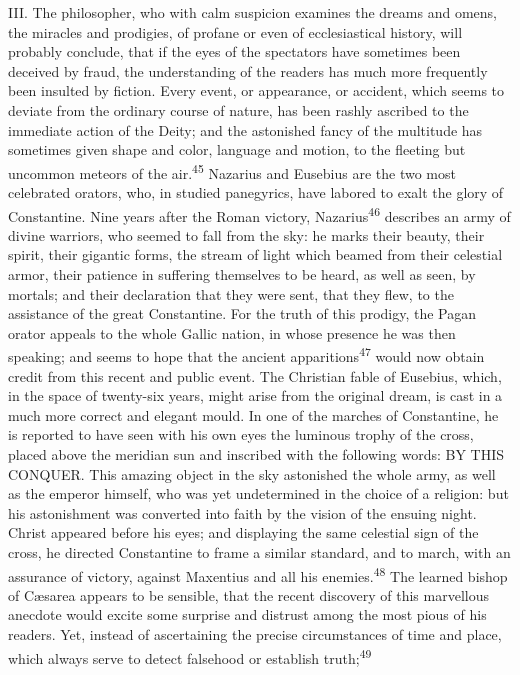 III. The philosopher, who with calm suspicion examines the dreams and
omens, the miracles and prodigies, of profane or even of ecclesiastical
history, will probably conclude, that if the eyes of the spectators
have sometimes been deceived by fraud, the understanding of the readers
has much more frequently been insulted by fiction. Every event, or
appearance, or accident, which seems to deviate from the ordinary
course of nature, has been rashly ascribed to the immediate action of
the Deity; and the astonished fancy of the multitude has sometimes
given shape and color, language and motion, to the fleeting but
uncommon meteors of the air.\textsuperscript{45} Nazarius and Eusebius are the two most
celebrated orators, who, in studied panegyrics, have labored to exalt
the glory of Constantine. Nine years after the Roman victory, Nazarius\textsuperscript{46}
describes an army of divine warriors, who seemed to fall from the
sky: he marks their beauty, their spirit, their gigantic forms, the
stream of light which beamed from their celestial armor, their patience
in suffering themselves to be heard, as well as seen, by mortals; and
their declaration that they were sent, that they flew, to the
assistance of the great Constantine. For the truth of this prodigy, the
Pagan orator appeals to the whole Gallic nation, in whose presence he
was then speaking; and seems to hope that the ancient apparitions\textsuperscript{47}
would now obtain credit from this recent and public event. The
Christian fable of Eusebius, which, in the space of twenty-six years,
might arise from the original dream, is cast in a much more correct and
elegant mould. In one of the marches of Constantine, he is reported to
have seen with his own eyes the luminous trophy of the cross, placed
above the meridian sun and inscribed with the following words: BY THIS
CONQUER. This amazing object in the sky astonished the whole army, as
well as the emperor himself, who was yet undetermined in the choice of
a religion: but his astonishment was converted into faith by the vision
of the ensuing night. Christ appeared before his eyes; and displaying
the same celestial sign of the cross, he directed Constantine to frame
a similar standard, and to march, with an assurance of victory, against
Maxentius and all his enemies.\textsuperscript{48} The learned bishop of Cæsarea appears
to be sensible, that the recent discovery of this marvellous anecdote
would excite some surprise and distrust among the most pious of his
readers. Yet, instead of ascertaining the precise circumstances of time
and place, which always serve to detect falsehood or establish truth;\textsuperscript{49}
